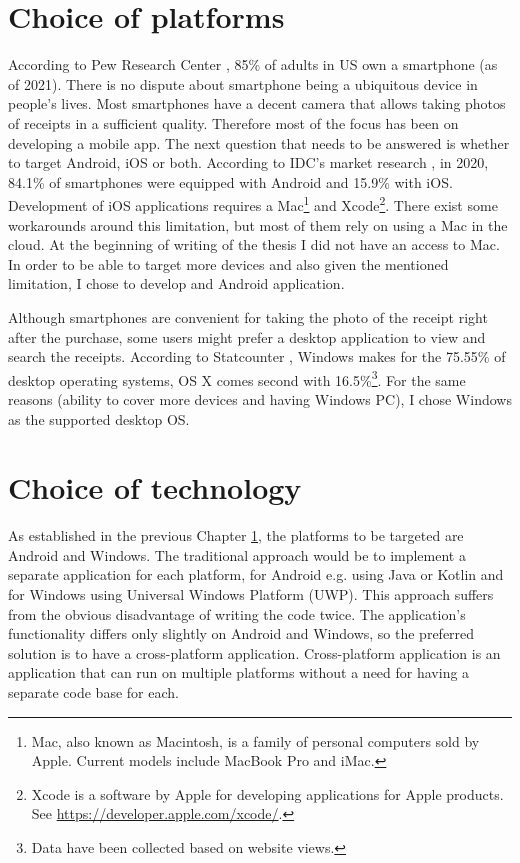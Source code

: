 \documentclass[
  digital, %
  table,   %
  oneside, %
  lof,     %
  lot,     %
]{fithesis3}
\begin{document}
\chapter{Choice of platforms}
\label{chap:choice_of_platforms}
According to Pew Research Center \cite{PewResearchCenter2021}, 85\% of adults in US own a smartphone (as of 2021). There is no dispute about smartphone being a ubiquitous device in people's lives. 
Most smartphones have a decent camera that allows taking photos of receipts in a sufficient quality. Therefore most of the focus has been on developing a mobile app.
The next question that needs to be answered is whether to target Android, iOS or both. According to IDC's market research \cite{Idc2021}, in 2020, 84.1\% of smartphones were equipped with Android and 15.9\% with iOS. Development of iOS applications requires a Mac\footnote{Mac, also known as Macintosh, is a family of personal computers sold by Apple. Current models include MacBook Pro and iMac.} and Xcode\footnote{Xcode is a software by Apple for developing applications for Apple products. See \url{https://developer.apple.com/xcode/}.}. There exist some workarounds around this limitation, but most of them rely on using a Mac in the cloud. At the beginning of writing of the thesis I did not have an access to Mac. In order to be able to target more devices and also given the mentioned limitation, I chose to develop and Android application.

Although smartphones are convenient for taking the photo of the receipt right after the purchase, some users might prefer a desktop application to view and search the receipts.
According to Statcounter \cite{Statcounter2021}, Windows makes for the 75.55\% of desktop operating systems, OS X comes second with 16.5\%\footnote{Data have been collected based on website views.}.
For the same reasons (ability to cover more devices and having Windows PC), I chose Windows as the supported desktop OS.

\chapter{Choice of technology}
As established in the previous Chapter \ref{chap:choice_of_platforms}, the platforms to be targeted are Android and Windows. The traditional approach would be to implement a separate application for each platform, for Android e.g. using Java or Kotlin and for Windows using  Universal Windows Platform (UWP). This approach suffers from the obvious disadvantage of writing the code twice. The application's functionality differs only slightly on Android and Windows, so the preferred solution is to have a cross-platform application. Cross-platform application is an application that can run on multiple platforms without a need for having a separate code base for each.
\end{document}
